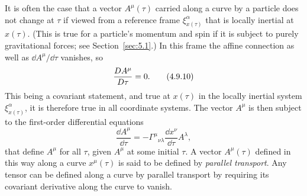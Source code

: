 It is often the case that a vector \(A^\mu(\tau)\) carried along a curve by a
particle does not change at \(\tau\) if viewed from a reference frame
\(\xi^\alpha_{x(\tau)}\) that is locally inertial at \(x(\tau)\). (This is
true for a particle's momentum and spin if it is subject to purely
gravitational forces; see Section~\ref{sec:5.1}.) In this frame the affine
connection as well as \(\dd A^\mu/\dd\tau\) vanishes, so
\begin{equation}
  \frac{D A^\mu}{D\tau}=0.
  \tag{4.9.10}\label{eq:4.9.10}
\end{equation}
This being a covariant statement, and true at \(x(\tau)\) in the locally
inertial system \(\xi^\alpha_{x(\tau)}\), it is therefore true in all
coordinate systems. The vector \(A^\mu\) is then subject to the first-order
differential equations
\begin{equation}
  \frac{\dd A^\mu}{\dd\tau}
  =
  -\Gamma^\mu{}_{\nu\lambda}
  \frac{\dd x^\nu}{\dd\tau}A^\lambda,
  \tag{4.9.11}\label{eq:4.9.11}
\end{equation}
that define \(A^\mu\) for all \(\tau\), given \(A^\mu\) at some initial
\(\tau\). A vector \(A^\mu(\tau)\) defined in this way along a curve
\(x^\mu(\tau)\) is said to be defined by \textit{parallel transport}. Any
tensor can be defined along a curve by parallel transport by requiring its
covariant derivative along the curve to vanish.
